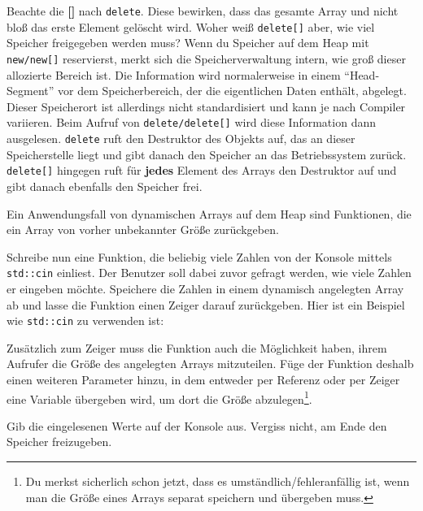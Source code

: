 
Beachte die \textbf{[]} nach \lstinline{delete}.
Diese bewirken, dass das gesamte Array und nicht bloß das erste Element gelöscht wird.
Woher weiß \lstinline{delete[]} aber, wie viel Speicher freigegeben werden muss? 
Wenn du Speicher auf dem Heap mit \lstinline{new/new[]} reservierst, merkt sich die Speicherverwaltung intern, wie groß dieser allozierte Bereich ist. 
Die Information wird normalerweise in einem ``Head-Segment'' vor dem Speicherbereich, der die eigentlichen Daten enthält, abgelegt.
Dieser Speicherort ist allerdings nicht standardisiert und kann je nach Compiler variieren.
Beim Aufruf von \lstinline{delete/delete[]} wird diese Information dann ausgelesen. 
\lstinline{delete} ruft den Destruktor des Objekts auf, das an dieser Speicherstelle liegt und gibt danach den Speicher an das Betriebssystem zurück. \lstinline{delete[]} hingegen ruft für \textbf{jedes} Element des Arrays den Destruktor auf und gibt danach ebenfalls den Speicher frei.

Ein Anwendungsfall von dynamischen Arrays auf dem Heap sind Funktionen, die ein Array von vorher unbekannter Größe zurückgeben.

Schreibe nun eine Funktion, die beliebig viele Zahlen von der Konsole mittels \lstinline{std::cin} einliest.
Der Benutzer soll dabei zuvor gefragt werden, wie viele Zahlen er eingeben möchte.
Speichere die Zahlen in einem dynamisch angelegten Array ab und lasse die Funktion einen Zeiger darauf zurückgeben.
Hier ist ein Beispiel wie \lstinline{std::cin} zu verwenden ist:


Zusätzlich zum Zeiger muss die Funktion auch die Möglichkeit haben, ihrem Aufrufer die Größe des angelegten Arrays mitzuteilen.
Füge der Funktion deshalb einen weiteren Parameter hinzu, in dem entweder per Referenz oder per Zeiger eine Variable übergeben wird, um dort die Größe abzulegen\footnote{Du merkst sicherlich schon jetzt, dass es umständlich/fehleranfällig ist, wenn man die Größe eines Arrays separat speichern und übergeben muss.}.

Gib die eingelesenen Werte auf der Konsole aus.
Vergiss nicht, am Ende den Speicher freizugeben.
